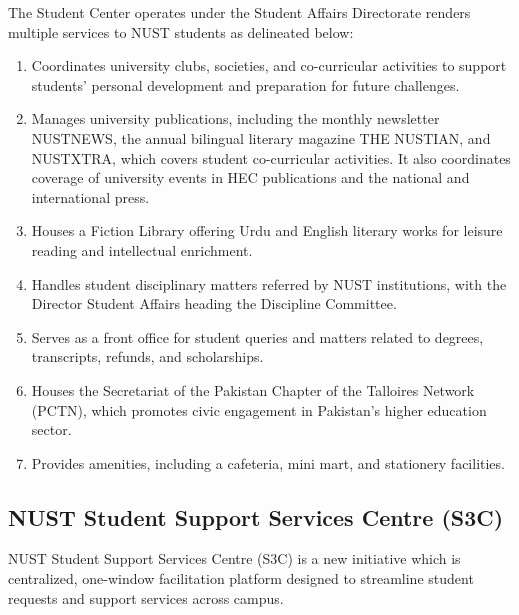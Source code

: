 The Student Center operates under the Student Affairs Directorate renders multiple services to NUST students as delineated below:
\begin{enumerate}[noitemsep, topsep=0pt]
\item Coordinates university clubs, societies, and co-curricular activities to support students’ personal development and preparation for future challenges.

\item Manages university publications, including the monthly newsletter NUSTNEWS, the annual bilingual literary magazine THE NUSTIAN, and NUSTXTRA, which covers student co-curricular activities. It also coordinates coverage of university events in HEC publications and the national and international press.

\item Houses a Fiction Library offering Urdu and English literary works for leisure reading and intellectual enrichment.

\item Handles student disciplinary matters referred by NUST institutions, with the Director Student Affairs heading the Discipline Committee.

\item Serves as a front office for student queries and matters related to degrees, transcripts, refunds, and scholarships.

\item Houses the Secretariat of the Pakistan Chapter of the Talloires Network (PCTN), which promotes civic engagement in Pakistan’s higher education sector.

\item Provides amenities, including a cafeteria, mini mart, and stationery facilities.
\end{enumerate}

\subsection{NUST Student Support Services Centre (S3C)}
NUST Student Support Services Centre (S3C) is a new initiative which is centralized, one-window facilitation platform designed to streamline student requests and support services across campus.



